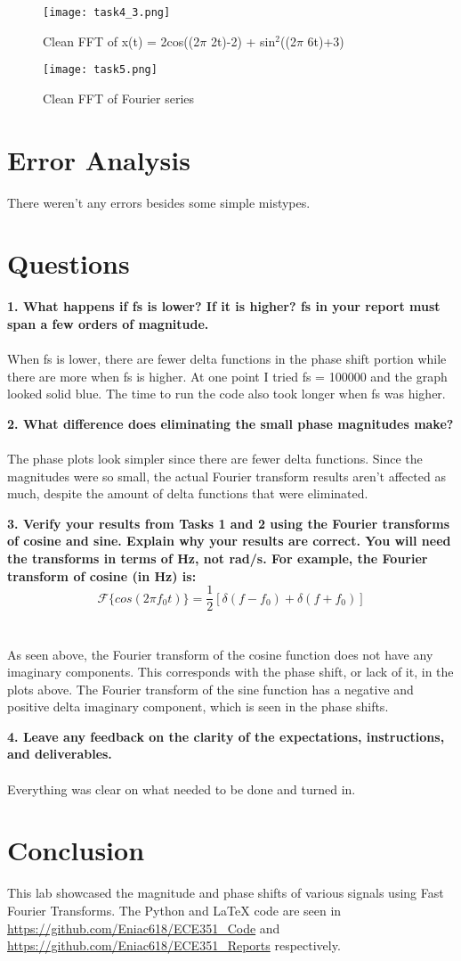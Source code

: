 \documentclass[12pt]{report}
\begin{document}
\begin{figure}[htp]
    \centering
    \texttt{[image: task4\_3.png]}
    \caption{Clean FFT of x(t) = 2cos((2$\pi$ 2t)-2) + sin$^2$((2$\pi$ 6t)+3)}
\end{figure}

\begin{figure}[htp]
    \centering
    \texttt{[image: task5.png]}
    \caption{Clean FFT of Fourier series}
\end{figure}

\pagebreak
\section{Error Analysis}
There weren't any errors besides some simple mistypes.
\section{Questions}
\textbf{1. What happens if fs is lower? If it is higher? fs in your report must span a few orders of
magnitude.} \\ \\
When fs is lower, there are fewer delta functions in the phase shift portion while there are more when fs is higher. At one point I tried fs = 100000 and the graph looked solid blue. The time to run the code also took longer when fs was higher.

\textbf{2. What difference does eliminating the small phase magnitudes make?} \\ \\
The phase plots look simpler since there are fewer delta functions. Since the magnitudes were so small, the actual Fourier transform results aren't affected as much, despite the amount of delta functions that were eliminated.

\textbf{3. Verify your results from Tasks 1 and 2 using the Fourier transforms of cosine and sine.
Explain why your results are correct. You will need the transforms in terms of Hz, not rad/s. For example, the Fourier transform of cosine (in Hz) is:
    $$ \mathcal{F}\{ cos(2\pi f_0 t) \} = \frac{1}{2}[ \delta(f-f_0) + \delta(f+f_0) ] $$} \\ \\
As seen above, the Fourier transform of the cosine function does not have any imaginary components. This corresponds with the phase shift, or lack of it, in the plots above. The Fourier transform of the sine function has a negative and positive delta imaginary component, which is seen in the phase shifts. 

\textbf{4. Leave any feedback on the clarity of the expectations, instructions, and deliverables.} \\ \\
Everything was clear on what needed to be done and turned in.

\section{Conclusion}
This lab showcased the magnitude and phase shifts of various signals using Fast Fourier Transforms. The Python and \LaTeX{} code are seen in \url{https://github.com/Eniac618/ECE351_Code} and \url{https://github.com/Eniac618/ECE351_Reports} respectively.
\end{document}
